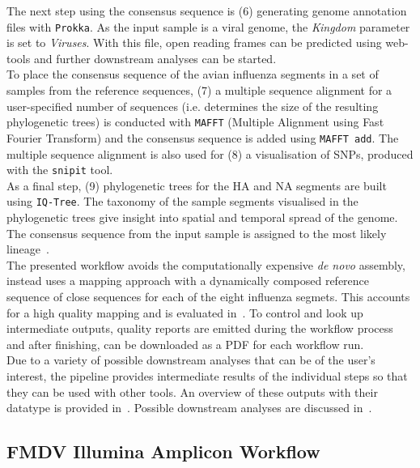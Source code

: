 The next step using the consensus sequence is (6) generating genome annotation files with \texttt{Prokka}. As the input sample is a viral genome, the \textit{Kingdom} parameter is set to \textit{Viruses}. With this file, open reading frames can be predicted using web-tools and further downstream analyses can be started. \\
To place the consensus sequence of the avian influenza segments in a set of samples from the reference sequences, (7) a multiple sequence alignment for a user-specified number of sequences (i.e. determines the size of the resulting phylogenetic trees) is conducted with \texttt{MAFFT} (Multiple Alignment using Fast Fourier Transform) and the consensus sequence is added using \texttt{MAFFT add}. The multiple sequence alignment is also used for (8) a visualisation of SNPs, produced with the \texttt{snipit} tool. \\
As a final step, (9) phylogenetic trees for the \ac{HA} and \ac{NA} segments are built using \texttt{IQ-Tree}. The taxonomy of the sample segments visualised in the phylogenetic trees give insight into spatial and temporal spread of the genome. The consensus sequence from the input sample is assigned to the most likely lineage~\cite{minh2020iq}. \\
The presented workflow avoids the computationally expensive \textit{de novo} assembly, instead uses a mapping approach with a dynamically composed reference sequence of close sequences for each of the eight influenza segmets. This accounts for a high quality mapping and is evaluated in~. To control and look up intermediate outputs, quality reports are emitted during the workflow process and after finishing, can be downloaded as a \ac{PDF} for each workflow run. \\
Due to a variety of possible downstream analyses that can be of the user's interest, the pipeline provides intermediate results of the individual steps so that they can be used with other tools. An overview of these outputs with their datatype is provided in~. Possible downstream analyses are discussed in~.


\subsection{FMDV Illumina Amplicon Workflow}\label{sec:fmdv-wf}
\todoit

